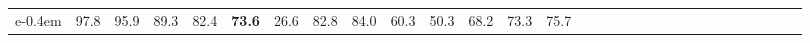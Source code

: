 \documentclass{article}
\begin{document}
\begin{table*}[]
\begin{tabular}{cc|cccccccccccccccccccccccccccc}
e{-0.4em} & \hspace{-0.9em}97.8\hspace{-0.4em} & \hspace{-0.9em}95.9\hspace{-0.4em} & \hspace{-0.9em}89.3\hspace{-0.4em} & \hspace{-0.9em}82.4\hspace{-0.4em} & \hspace{-0.9em}\textbf{73.6}\hspace{-0.4em} & \hspace{-0.9em}26.6\hspace{-0.4em} & \hspace{-0.9em}82.8\hspace{-0.4em} & \hspace{-0.9em}84.0\hspace{-0.4em} & \hspace{-0.9em}60.3\hspace{-0.4em} & \hspace{-0.9em}50.3\hspace{-0.4em} & \hspace{-0.9em}68.2\hspace{-0.4em} & \hspace{-0.9em}73.3\hspace{-0.4em} & \hspace{-0.9em}75.7\hspace{-0.4em} 
        \\

\end{tabular}
\end{table*}
\end{document}
